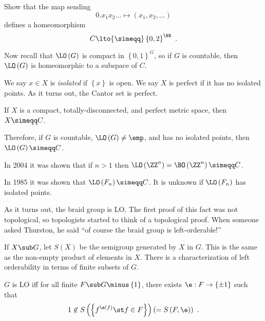 \begin{exr}
Show that the map sending
\begin{equation}
0. x_1 x_2 \ldots \mapsto \left(x_1 , x_2 , \ldots\right)
\end{equation}
defines a homeomorphism
\begin{equation}
C\lto{\simeqq} \left\{0,2\right\}^\NN
\ .
\end{equation}
\end{exr}

Now recall that $\LO\left(G\right)$ is compact in $\left\{0,1\right\}^G$, so if $G$
is countable, then $\LO\left(G\right)$ is homeomorphic to a subspace of $C$.

We say $x\in X$ is \emph{isolated} if $\left\{x\right\}$ is open. 
We say $X$ is perfect if it has no isolated points.
As it turns out, the Cantor set is perfect.

\begin{thm*}
If $X$ is a compact, totally-disconnected, and perfect metric space, then $X\simeqq C$.
\end{thm*}

Therefore, if $G$ is countable, $\LO\left(G\right)\neq \emp$, and has no isolated points,
then $\LO\left(G\right)\simeqq C$.

\begin{exm}
In 2004
\cite{sikora} it was shown
that if $n > 1$ then $\LO\left(\ZZ^n\right) = \BO\left(\ZZ^n\right)\simeqq
C$.
\end{exm}

\begin{exm}
In 1985 \cite{mc} it was shown that
$\LO\left(F_n\right)\simeqq C$.
It is unknown if $\LO\left(F_n\right)$ has isolated points.
\end{exm}

\begin{rmk}
As it turns out, the braid group is LO. The first proof of this fact was 
not topological, so topologists started to think of a topological proof. When
someone asked
Thurston, he said 
``of course the braid group is left-orderable!''
\end{rmk}

If $X\sub G$, let $S\left(X\right)$ be the semigroup generated by $X$ in $G$. This is the same 
as the non-empty product of elements in $X$.
There is a characterization of left orderability in terms of finite subsets of $G$.

\begin{thm}
$G$ is LO iff for all finite $F\sub G\minus \left\{1\right\}$, there exists $\e : F\to
\left\{\pm 1\right\}$ such that
\begin{equation}
1\not \in S\left(\left\{f^{\e\left(f\right)} \st f\in F\right\}\right) \left(
= S\left(F , \e\right)
\right)
\ .
\label{eqn:5*}
\end{equation}
\label{thm:2.3}
\end{thm}

